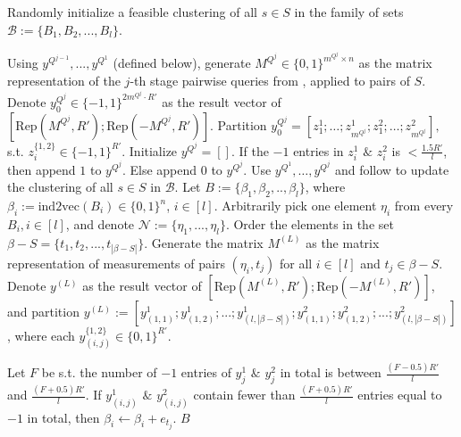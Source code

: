 \documentclass[10pt,a4paper]{amsart}
\newcommand\mc{\mathcal}
\begin{document}
\begin{algorithm}
\begin{algorithmic}[1]
    \State Randomly initialize a feasible clustering of all $s\in S$ in the family of sets $\mc{B}:=\{B_1,B_2,...,B_l\}$.  
    \begin{scriptsize}\end{scriptsize}
    \State Using $y^{Q^{j-1}},...,y^{Q^1}$ (defined below), generate $M^{Q^j}\in\{0,1\}^{m^{Q^j}\times n}$ as the matrix representation of the $j$-th stage pairwise queries from \cite[Theorem~1.1]{black2025learning}, applied to pairs of $S$. 
    \State Denote $y^{Q^j}_0\in\{-1,1\}^{2m^{Q^j}\cdot R'}$ as the result vector of \([\mathrm{Rep}(M^{Q^j},R');\mathrm{Rep}(-M^{Q^j},R')].\)
    \State Partition
    \(
    y^{Q^j}_0=[z_1^1;\ldots;z_{m^{Q^j}}^1;z_1^2;\ldots;z_{m^{Q^j}}^2],
    \)
    s.t. $z_i^{\{1,2\}}\in\{-1,1\}^{R'}$. Initialize $y^{Q^j}= []$.
        \State If the $-1$ entries in $z_i^1$ $\&$ $z_i^2$ is $<\frac{1.5R'}{l}$, then append $1$ to $y^{Q^j}$. Else append $0$ to $y^{Q^j}$.
    \EndFor
\State Use $y^{Q^1},\ldots,y^{Q^j}$ and follow \cite[Theorem~1.1]{black2025learning} to update the clustering of all $s\in S$ in $\mathcal{B}$.
    \EndFor
    \State Let $B:=\{\beta_1,\beta_2,..,\beta_l\}$, where $\beta_i:=\mathrm{ind2vec}(B_i)\in\{0,1\}^n$, $i\in[l]$.
    \State Arbitrarily pick one element $\eta_i$ from every $B_i,i\in[l]$, and denote $\mc{N}:=\{\eta_1,...,\eta_l\}$. Order the elements in the set $\beta-S=\{t_1,t_2,...,t_{|\beta-S|}\}$. Generate the matrix $M^{(L)}$ as the matrix representation of measurements of pairs $(\eta_i,t_j)$ for all $i\in[l]$ and $t_j\in\beta-S$. %
    \State Denote $y^{(L)}$ as the result vector of $[\mathrm{Rep}(M^{(L)},R');\mathrm{Rep}(-M^{(L)},R')]$, and partition $y^{(L)}:=[y_{(1,1)}^1;y_{(1,2)}^1;...;y_{(l,|\beta-S|)}^1;y_{(1,1)}^2;y_{(1,2)}^2;...;y_{(l,|\beta-S|)}^2]$, where each $y_{(i,j)}^{\{1,2\}}\in \{0,1\}^{R'}$. 
    
    \begin{scriptsize}
    \end{scriptsize}
    \State Let $F$ be s.t. the number of $-1$ entries of $y_j^1$ $\&$ $y_j^2$ in total is between $\frac{(F-0.5)R'}{l}$ and $\frac{(F+0.5)R'}{l}$. 
    \State If $y_{(i,j)}^1$ $\&$ $y_{(i,j)}^2$ contain fewer than $\frac{(F+0.5)R'}{l}$ entries equal to $-1$ in total, then $\beta_i\leftarrow\beta_i+e_{t_j}$.
    \EndFor
    \State \Return $B$ 

\end{algorithmic}
\end{algorithm}
\end{document}
